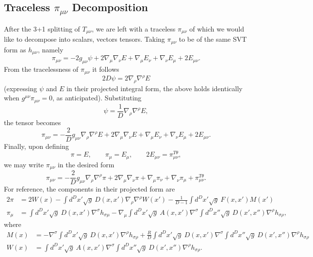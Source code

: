 \documentclass[10pt,letterpaper]{article}
\numberwithin{equation}{subsection}
\begin{document}
\subsection{Traceless $\pi_{\mu\nu}$ Decomposition}
After the 3+1 splitting of $T_{\mu\nu}$, we are left with a traceless $\pi_{\mu\nu}$ of which we would like to decompose into scalars, vectors tensors. Taking $\pi_{\mu\nu}$ to be of the same SVT form as $h_{\mu\nu}$, namely
\begin{equation}
\pi_{\mu\nu} = -2 g_{\mu\nu}\psi + 2\nabla_\mu \nabla_\nu E + \nabla_\mu E_\nu +\nabla_\nu E_\mu + 2E_{\mu\nu}.
\end{equation}
From the tracelessness of $\pi_{\mu\nu}$ it follows
\begin{equation}
2D\psi = 2 \nabla_\rho \nabla^\rho E
\end{equation}
(expressing $\psi$ and $E$ in their projected integral form, the above holds identically when $g^{\mu\nu}\pi_{\mu\nu}=0$, as anticipated). 
Substituting
\begin{equation}
\psi = \frac{1}{D} \nabla_\rho \nabla^\rho E, 
\end{equation}
the tensor becomes
\begin{equation}
\pi_{\mu\nu} = -\frac{2}{D}g_{\mu\nu}\nabla_\rho \nabla^\rho E + 2\nabla_\mu \nabla_\nu E + \nabla_\mu E_\nu +\nabla_\nu E_\mu + 2E_{\mu\nu}.
\end{equation}
Finally, upon defining
\begin{equation}
\pi = E,\qquad \pi_\mu = E_\mu,\qquad 2E_{\mu\nu}=\pi_{\mu\nu}^{T\theta},
\end{equation}
we may write $\pi_{\mu\nu}$ in the desired form
\begin{equation}
\pi_{\mu\nu} = -\frac{2}{D}g_{\mu\nu}\nabla_\rho \nabla^\rho \pi + 2\nabla_\mu \nabla_\nu \pi + \nabla_\mu \pi_\nu +\nabla_\nu \pi_\mu + \pi^{T\theta}_{\mu\nu}.
\end{equation}
For reference, the components in their projected form are
\begin{align}
2\pi &= 2W(x)- \int d^Dx' \sqrt{g}\ D(x,x')\nabla_\rho \nabla^\rho W(x') - \frac{1}{D-1} \int  d^Dx' \sqrt{g}\ F(x,x') M(x')
\nonumber\\
\pi_{\mu}&=  \int d^Dx' \sqrt{g}\ D(x,x')\nabla^\sigma h_{\sigma\mu} - \nabla_\mu \int d^Dx' \sqrt{g}\ A(x,x')
\nabla^\sigma \int d^Dx'' \sqrt{g}\ D(x',x'') \nabla^\rho h_{\sigma\rho},
\end{align}
where
\begin{align}
M(x) &= - \nabla^\sigma \int d^Dx' \sqrt{g}\ D(x,x') \nabla^\rho h_{\sigma\rho}
 +\frac{R}{D}\int d^Dx' \sqrt g\ D(x,x') \nabla^\sigma \int d^Dx'' \sqrt{g}\ D(x',x'') \nabla^\rho h_{\sigma\rho}
\nonumber\\
W(x) &=  \int d^Dx' \sqrt{g}\ A(x,x') \nabla^\sigma  \int   d^Dx'' \sqrt{g}\ D(x',x'') \nabla^\rho h_{\sigma\rho}.
\end{align}
\end{document}
